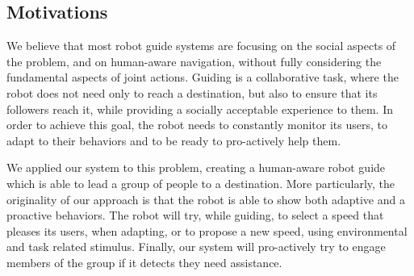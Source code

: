 \subsection{Motivations}
We believe that most robot guide systems are focusing on the social aspects of the problem, and on human-aware navigation, without fully considering the fundamental aspects of joint actions. Guiding is a collaborative task, where the robot does not need only to reach a destination, but also to ensure that its followers reach it, while providing a socially acceptable experience to them. In order to achieve this goal, the robot needs to constantly monitor its users, to adapt to their behaviors and to be ready to pro-actively help them.

We applied our system to this problem, creating a human-aware robot guide which is able to lead a group of people to a destination. More particularly, the originality of our approach is that the robot is able to show both adaptive and a proactive behaviors. The robot will try, while guiding, to select a speed that pleases its users, when adapting, or to propose a new speed, using environmental and task related stimulus. Finally, our system will pro-actively try to engage members of the group if it detects they need assistance. 

